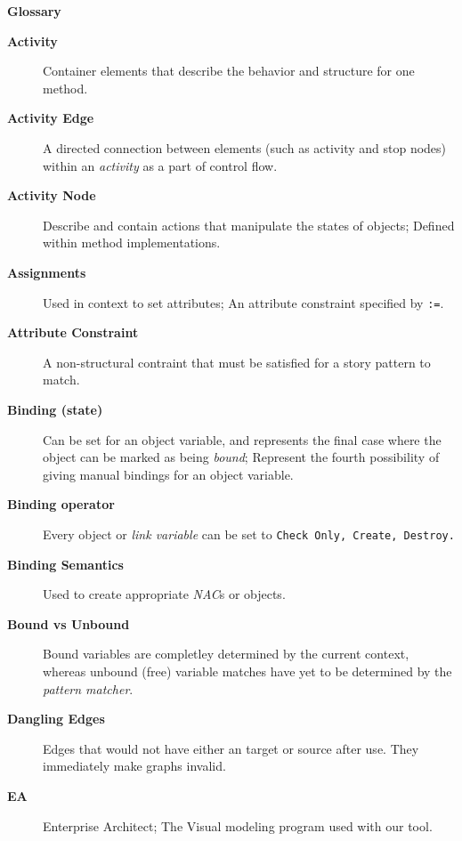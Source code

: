 \newpage
{}
{}

\vspace{1cm}
{\Huge \bf Glossary}
\vspace{1cm}

\begin{description}

\item[\bf Activity]
Container elements that describe the behavior and structure for one method.

\item[\bf Activity Edge]
A directed connection between elements (such as activity and stop nodes) within an \emph{activity} as a part of control flow.

\item[\bf Activity Node]
Describe and contain actions that manipulate the states of objects; Defined within method implementations.

\item[\bf Assignments]
Used in context to set attributes; An attribute constraint specified by \texttt{:=}.

\item[\bf Attribute Constraint]
A non-structural contraint that must be satisfied for a story pattern to match.

\item[\bf Binding (state)]
Can be set for an object variable, and represents the final case where the object can be marked as being \emph{bound}; Represent the fourth 
possibility of giving manual bindings for an object variable.

\item[\bf Binding operator]
Every object or \emph{link variable} can be set to \texttt{Check Only, Create, Destroy.}

\item[\bf Binding Semantics]
Used to create appropriate \emph{NAC}s or objects.

\item[\bf Bound vs Unbound]
Bound variables are completley determined by the current context, whereas unbound (free) variable matches have yet to be determined by the \emph{pattern matcher}.

\item[\bf Dangling Edges]
Edges that would not have either an target or source after use. They immediately make graphs invalid.

\item[\bf EA]
Enterprise Architect; The Visual modeling program used with our tool.


\end{description}
